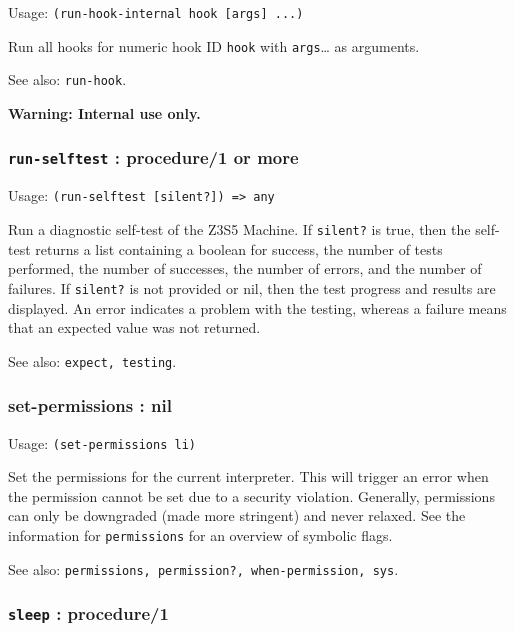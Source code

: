 \documentclass[
]{article}
\newcommand{\passthrough}[1]{#1}
\begin{document}
Usage: \passthrough{\lstinline!(run-hook-internal hook [args] ...)!}

Run all hooks for numeric hook ID \passthrough{\lstinline!hook!} with
\passthrough{\lstinline!args!}\ldots{} as arguments.

See also: \passthrough{\lstinline!run-hook!}.

\textbf{Warning: Internal use only.}

\hypertarget{run-selftest-procedure1-or-more}{%
\subsubsection{\texorpdfstring{\texttt{run-selftest} : procedure/1 or
more}{run-selftest : procedure/1 or more}}\label{run-selftest-procedure1-or-more}}

Usage: \passthrough{\lstinline!(run-selftest [silent?]) => any!}

Run a diagnostic self-test of the Z3S5 Machine. If
\passthrough{\lstinline!silent?!} is true, then the self-test returns a
list containing a boolean for success, the number of tests performed,
the number of successes, the number of errors, and the number of
failures. If \passthrough{\lstinline!silent?!} is not provided or nil,
then the test progress and results are displayed. An error indicates a
problem with the testing, whereas a failure means that an expected value
was not returned.

See also: \passthrough{\lstinline!expect, testing!}.

\hypertarget{set-permissions-nil}{%
\subsubsection{set-permissions : nil}\label{set-permissions-nil}}

Usage: \passthrough{\lstinline!(set-permissions li)!}

Set the permissions for the current interpreter. This will trigger an
error when the permission cannot be set due to a security violation.
Generally, permissions can only be downgraded (made more stringent) and
never relaxed. See the information for
\passthrough{\lstinline!permissions!} for an overview of symbolic flags.

See also:
\passthrough{\lstinline!permissions, permission?, when-permission, sys!}.

\hypertarget{sleep-procedure1}{%
\subsubsection{\texorpdfstring{\texttt{sleep} :
procedure/1}{sleep : procedure/1}}\label{sleep-procedure1}}
\end{document}
